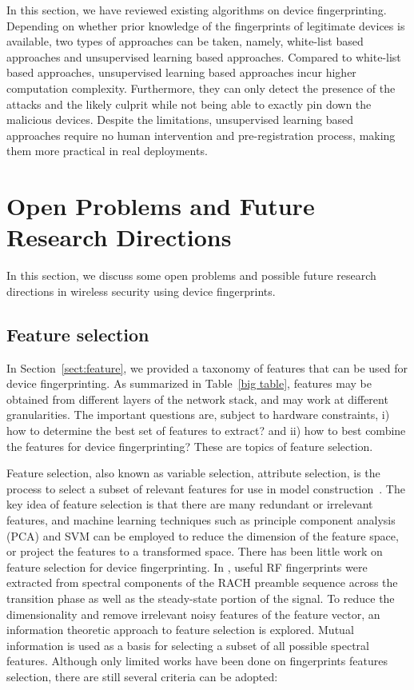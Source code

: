 \documentclass[journal,draftcls,onecolumn,11pt]{IEEEtran}
\newcounter{ctr}\setcounter{ctr}{0}
\begin{document}
In this section, we have reviewed existing algorithms on device fingerprinting.  Depending on whether prior knowledge of the fingerprints of legitimate devices is available, two types of approaches can be taken, namely, white-list based approaches and unsupervised learning based approaches. Compared to white-list based approaches, unsupervised learning based approaches incur higher computation complexity. Furthermore, they can only detect the presence of the attacks and the likely culprit while not being able to exactly pin down the malicious devices. Despite the limitations, unsupervised learning based approaches require no human intervention and pre-registration process, making them more practical in real deployments.

\section{Open Problems and Future Research Directions}
\label{sect:future}
In this section, we discuss some open problems and possible future research directions in wireless security using device fingerprints.

\subsection{Feature selection}

In Section~\ref{sect:feature}, we provided a taxonomy of features that can be used for device fingerprinting. As summarized in Table~\ref{big table}, features may be obtained from different layers of the network stack, and may work at different granularities. The important questions are, subject to hardware constraints, i) how to determine the best set of features to extract?  and ii) how to best combine the features for device fingerprinting? These are topics of feature selection.

Feature selection, also known as variable selection, attribute selection, is the process to select a subset of relevant features for use in model construction~\cite{Guyon2003}.  The key idea of feature selection is that there are many redundant or irrelevant features, and machine learning techniques such as principle component analysis (PCA) and SVM can be employed to reduce the dimension of the feature space, or project the features to a transformed space. There has been little work on feature selection for device fingerprinting. In \cite{Scanlon2010}, useful RF fingerprints were extracted from spectral components of the RACH preamble sequence across the transition phase as well as the steady-state portion of the signal. To reduce the dimensionality and remove irrelevant noisy features of the feature vector, an information theoretic approach to feature selection is explored. Mutual information is used as a basis for selecting a subset of all possible spectral features. Although only limited works have been done on fingerprints features selection, there are still several criteria can be adopted:
\end{document}
